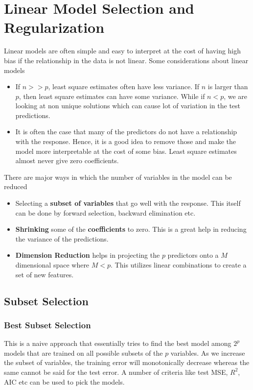 \documentclass[../statistical_learning_notes.tex]{subfiles}
\begin{document}
    \chapter{Linear Model Selection and Regularization}
    Linear models are often simple and easy to interpret at the cost of having high bias if the relationship in the data is not linear. Some considerations about linear models
    \begin{itemize}
        \item If $n >> p$, least square estimates often have less variance. If $n$ is larger than $p$, then least square estimates can have some variance. While if $n < p$, we are looking at non unique solutions which can cause lot of variation in the test predictions.
        \item It is often the case that many of the predictors do not have a relationship with the response. Hence, it is a good idea to remove those and make the model more interpretable at the cost of some bias. Least square estimates almost never give zero coefficients.
    \end{itemize}

    There are major ways in which the number of variables in the model can be reduced
    \begin{itemize}
        \item Selecting a \textbf{subset of variables} that go well with the response. This itself can be done by forward selection, backward elimination etc.
        \item \textbf{Shrinking} some of the \textbf{coefficients} to zero. This is a great help in reducing the variance of the predictions.
        \item \textbf{Dimension Reduction} helps in projecting the $p$ predictors onto a $M$ dimensional space where $M < p$. This utilizes linear combinations to create a set of new features.
    \end{itemize}

    \section{Subset Selection}
    \subsection{Best Subset Selection}
    This is a naive approach that essentially tries to find the best model among $2^{p}$ models that are trained on all possible subsets of the $p$ variables. As we increase the subset of variables, the training error will monotonically decrease whereas the same cannot be said for the test error. A number of criteria like test MSE, $R^{2}$, AIC etc can be used to pick the models.\newline
\end{document}
